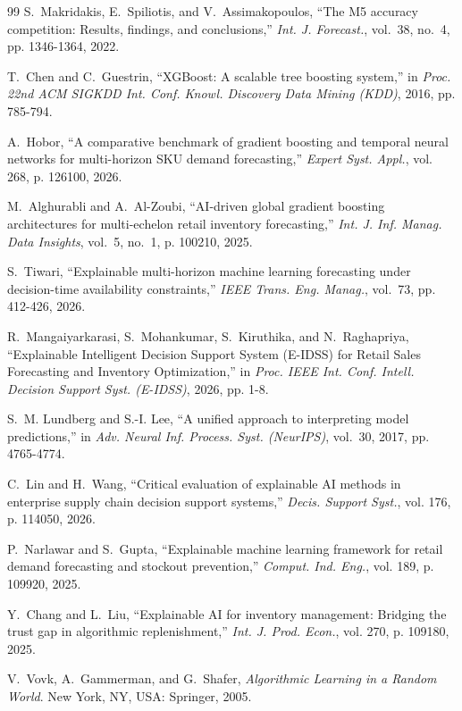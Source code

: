 \documentclass[11pt,a4paper]{article}
\begin{document}
\begin{thebibliography}{99}
S.~Makridakis, E.~Spiliotis, and V.~Assimakopoulos, ``The M5 accuracy competition: Results, findings, and conclusions,'' \emph{Int. J. Forecast.}, vol.~38, no.~4, pp. 1346-1364, 2022.

T.~Chen and C.~Guestrin, ``XGBoost: A scalable tree boosting system,'' in \emph{Proc. 22nd ACM SIGKDD Int. Conf. Knowl. Discovery Data Mining (KDD)}, 2016, pp. 785-794.

A.~Hobor, ``A comparative benchmark of gradient boosting and temporal neural networks for multi-horizon SKU demand forecasting,'' \emph{Expert Syst. Appl.}, vol. 268, p. 126100, 2026.

M.~Alghurabli and A.~Al-Zoubi, ``AI-driven global gradient boosting architectures for multi-echelon retail inventory forecasting,'' \emph{Int. J. Inf. Manag. Data Insights}, vol.~5, no.~1, p. 100210, 2025.

S.~Tiwari, ``Explainable multi-horizon machine learning forecasting under decision-time availability constraints,'' \emph{IEEE Trans. Eng. Manag.}, vol.~73, pp. 412-426, 2026.

R.~Mangaiyarkarasi, S.~Mohankumar, S.~Kiruthika, and N.~Raghapriya, ``Explainable Intelligent Decision Support System (E-IDSS) for Retail Sales Forecasting and Inventory Optimization,'' in \emph{Proc. IEEE Int. Conf. Intell. Decision Support Syst. (E-IDSS)}, 2026, pp. 1-8.

S.~M. Lundberg and S.-I. Lee, ``A unified approach to interpreting model predictions,'' in \emph{Adv. Neural Inf. Process. Syst. (NeurIPS)}, vol.~30, 2017, pp. 4765-4774.

C.~Lin and H.~Wang, ``Critical evaluation of explainable AI methods in enterprise supply chain decision support systems,'' \emph{Decis. Support Syst.}, vol. 176, p. 114050, 2026.

P.~Narlawar and S.~Gupta, ``Explainable machine learning framework for retail demand forecasting and stockout prevention,'' \emph{Comput. Ind. Eng.}, vol. 189, p. 109920, 2025.

Y.~Chang and L.~Liu, ``Explainable AI for inventory management: Bridging the trust gap in algorithmic replenishment,'' \emph{Int. J. Prod. Econ.}, vol. 270, p. 109180, 2025.

V.~Vovk, A.~Gammerman, and G.~Shafer, \emph{Algorithmic Learning in a Random World}. New York, NY, USA: Springer, 2005.


\end{thebibliography}
\end{document}
